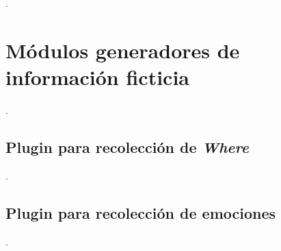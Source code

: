 .



\section{Módulos generadores de información ficticia}

.


\subsection{Plugin para recolección de \textit{Where}}

.


\subsection{Plugin para recolección de emociones}

.



